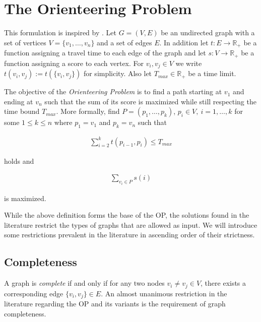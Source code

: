 \section{The Orienteering Problem} %
\label{sec:02:problem}

This formulation is inspired by \citeauthor{vansteenwegen_orienteering_2011} \cite{vansteenwegen_orienteering_2011}.
Let $G=(V,E)$ be an undirected graph with a set of vertices $V = \{v_1, \dots, v_n\}$ and a set of edges $E$.
In addition let $t: E \rightarrow \mathbb{R}_+$ be a function assigning a travel time to each edge of the graph and let
$s: V \rightarrow \mathbb{R}_+$ be a function assigning a score to each vertex.
For $v_i, v_j \in V$ we write $t(v_i, v_j) := t(\{v_i, v_j\})$ for simplicity.
Also let $T_{max} \in \mathbb{R}_+$ be a time limit.

The objective of the \emph{Orienteering Problem} is to find a path starting at $v_1$ and ending at $v_n$ 
such that the sum of its score is maximized while still respecting the time bound $T_{max}$.
More formally, find $P = (p_1, \dots, p_k)$, $p_i \in V,\ i=1,\dots, k$ for some $1 \leq k \leq n$ where $p_1 = v_1$ and $p_k = v_n$ such that

\begin{align*}
  \sum_{i = 2}^k t(p_{i-1}, p_i) \leq T_{max}
\end{align*}

holds and

\begin{align*}
  \sum_{v_i \in P} s(i)
\end{align*}

is maximized.


While the above definition forms the base of the OP, the solutions found in the literature restrict the types of graphs that are allowed as input.
We will introduce some restrictions prevalent in the literature in ascending order of their strictness. 

\subsection{Completeness}
\label{subsec:02:complete}

A graph is \emph{complete} if and only if for any two nodes $v_i \neq v_j \in V$, there exists a corresponding edge $\{v_i, v_j\} \in E$.
An almost unanimous \cite{vansteenwegen_orienteering_2011} restriction in the literature regarding the OP and its variants is the requirement of graph completeness. \cite{szwarc_novel_2022,vansteenwegen_orienteering_2011,laporte_selective_1990,santini_hazardous_2022}

